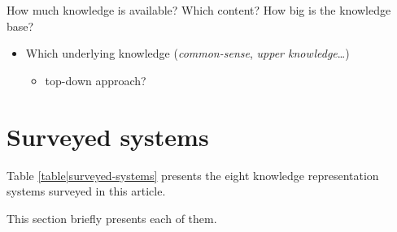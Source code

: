 How much knowledge is available? Which content? How big is the knowledge base?

\begin{itemize}
	\item  Which underlying knowledge (\emph{common-sense}, \emph{upper knowledge}\ldots{})
	\begin{itemize}
		\item  top-down approach?
	\end{itemize}

\end{itemize}




\section{Surveyed systems}
\label{sect|surveyed-systems}

Table \ref{table|surveyed-systems} presents the eight knowledge representation
systems surveyed in this article.

This section briefly presents each of them.

